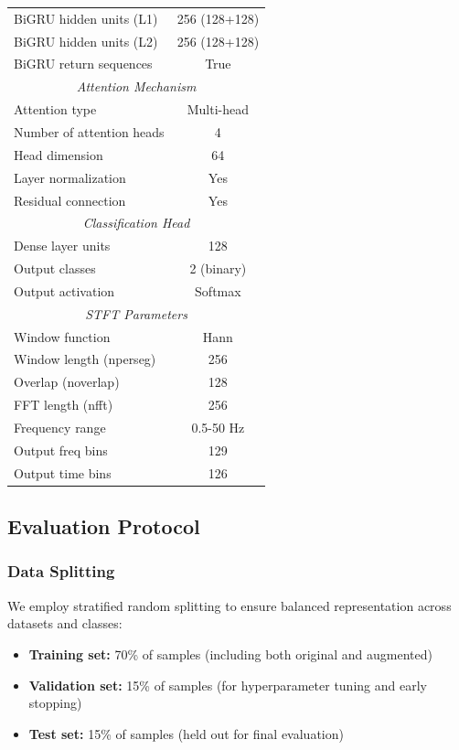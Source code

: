 \documentclass[conference]{IEEEtran}
\begin{document}
\begin{table}[!htbp]
\begin{tabular}{lc}
BiGRU hidden units (L1) & 256 (128+128) \\
BiGRU hidden units (L2) & 256 (128+128) \\
BiGRU return sequences & True \\
\midrule
\multicolumn{2}{c}{\textit{Attention Mechanism}} \\
Attention type & Multi-head \\
Number of attention heads & 4 \\
Head dimension & 64 \\
Layer normalization & Yes \\
Residual connection & Yes \\
\midrule
\multicolumn{2}{c}{\textit{Classification Head}} \\
Dense layer units & 128 \\
Output classes & 2 (binary) \\
Output activation & Softmax \\
\midrule
\multicolumn{2}{c}{\textit{STFT Parameters}} \\
Window function & Hann \\
Window length (nperseg) & 256 \\
Overlap (noverlap) & 128 \\
FFT length (nfft) & 256 \\
Frequency range & 0.5-50 Hz \\
Output freq bins & 129 \\
Output time bins & 126 \\
\bottomrule
\end{tabular}
\end{table}

\subsection{Evaluation Protocol}

\subsubsection{Data Splitting}

We employ stratified random splitting to ensure balanced representation across datasets and classes:

\begin{itemize}
    \item \textbf{Training set:} 70\% of samples (including both original and augmented)
    \item \textbf{Validation set:} 15\% of samples (for hyperparameter tuning and early stopping)
    \item \textbf{Test set:} 15\% of samples (held out for final evaluation)
\end{itemize}
\end{document}
